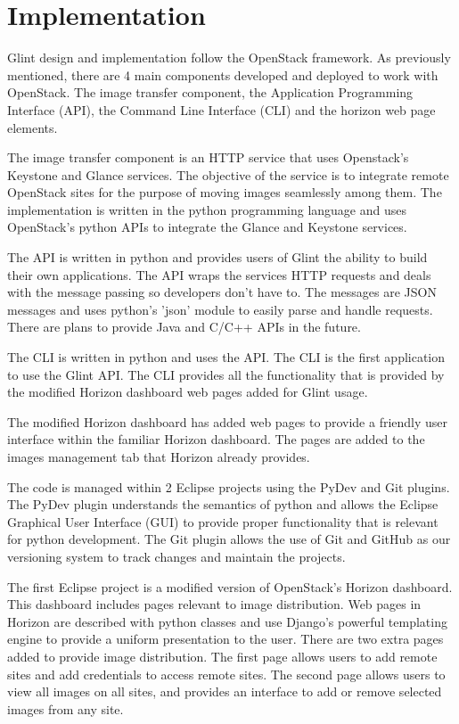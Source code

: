 \documentclass[a4paper]{jpconf}
\begin{document}
\section{Implementation}

Glint design and implementation follow the OpenStack framework. As previously mentioned, there are 4 main components developed and deployed to work with OpenStack. The image transfer component, the Application Programming Interface (API), the Command Line Interface (CLI) and the horizon web page elements. 

The image transfer component is an HTTP service that uses Openstack's Keystone and Glance services. The objective of the service is to integrate remote OpenStack sites for the purpose of moving images seamlessly among them. The implementation is written in the python programming language and uses OpenStack's python APIs to integrate the Glance and Keystone services.

The API is written in python and provides users of Glint the ability to build their own applications. The API wraps the services HTTP requests and deals with the message passing so developers don't have to. The messages are JSON messages and uses python's 'json' module to easily parse and handle requests. There are plans to provide Java and C/C++ APIs in the future.

The CLI is written in python and uses the API. The CLI is the first application to use the Glint API. The CLI provides all the functionality that is provided by the modified Horizon dashboard web pages added for Glint usage.

The modified Horizon dashboard has added web pages to provide a friendly user interface within the familiar Horizon dashboard. The pages are added to the images management tab that Horizon already provides. 

The code is managed within 2 Eclipse projects using the PyDev and Git plugins. The PyDev plugin understands the semantics of python and allows the Eclipse Graphical User Interface (GUI) to provide proper functionality that is relevant for python development. The Git plugin allows the use of Git and GitHub as our versioning system to track changes and maintain the projects. 

The first Eclipse project is a modified version of OpenStack's Horizon dashboard. This dashboard includes pages relevant to image distribution. Web pages in Horizon are described with python classes and use Django's powerful templating engine to provide a uniform presentation to the user. There are two extra pages added to provide image distribution. The first page allows users to add remote sites and add credentials to access remote sites. The second page allows users to view all images on all sites, and provides an interface to add or remove selected images from any site.
\end{document}
